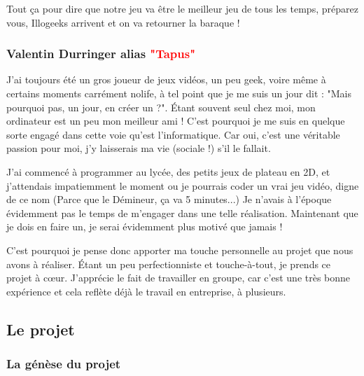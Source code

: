 \documentclass{article}
\begin{document}
\par

\fontsize{12}{12}
\par
\normalsize Tout ça pour dire que notre jeu va être le meilleur jeu de tous les temps, préparez vous, Illogeeks arrivent et on va retourner la baraque !
\newline




\newpage
\subsubsection{Valentin Durringer alias \textcolor{red}{"Tapus"}}

\par
J'ai toujours été un gros joueur de jeux vidéos, un peu geek, voire même à certains moments carrément nolife, à tel point que je me suis un jour dit : "Mais pourquoi pas, un jour, en créer un ?". Étant souvent seul chez moi, mon ordinateur est un peu mon meilleur ami ! C'est pourquoi je me suis en quelque sorte engagé dans cette voie qu'est l'informatique. Car oui, c'est une véritable passion pour moi, j'y laisserais ma vie (sociale !) s'il le fallait.
\newline

\par
J'ai commencé à programmer au lycée, des petits jeux de plateau en 2D, et j'attendais impatiemment le moment ou je pourrais coder un vrai jeu vidéo, digne de ce nom (Parce que le Démineur, ça va 5 minutes...) Je n'avais à l'époque évidemment pas le temps de m'engager dans une telle réalisation. Maintenant que je dois en faire un, je serai évidemment plus motivé que jamais !
\newline

\par
C'est pourquoi je pense donc apporter ma touche personnelle au projet que nous avons à réaliser. Étant un peu perfectionniste et touche-à-tout, je prends ce projet à cœur. J'apprécie le fait de travailler en groupe, car c'est une très bonne expérience et cela reflète déjà le travail en entreprise, à plusieurs.
\newline



\newpage
\subsection{Le projet}
\subsubsection{La génèse du projet}
\end{document}
